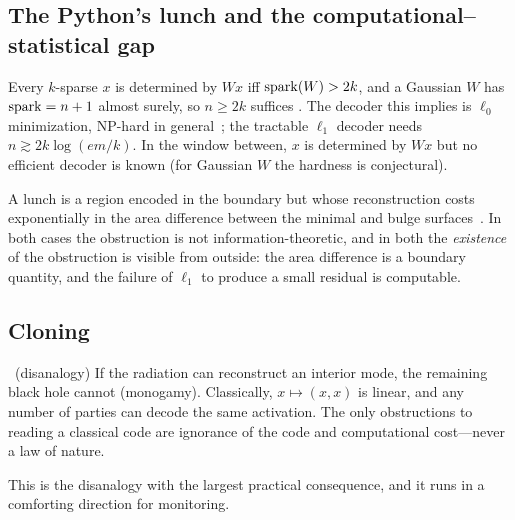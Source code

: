 \subsection{The Python's lunch and the computational--statistical gap}
Every $k$-sparse $x$ is determined by $Wx$ iff $\operatorname{spark}(W)>2k$, and a Gaussian $W$ has $\operatorname{spark}=n+1$ almost surely,
so $n\ge2k$ suffices \proved. The decoder this implies is $\ell_0$ minimization, NP-hard in
general~\cite{Natarajan}; the tractable $\ell_1$ decoder needs $n\gtrsim2k\log(em/k)$. In the window between, $x$
is determined by $Wx$ but no efficient decoder is known (for Gaussian $W$ the hardness is conjectural).
\begin{entry}\analogy
A lunch is a region encoded in the boundary but whose reconstruction costs exponentially in the area difference
between the minimal and bulge surfaces~\cite{Lunch}. In both cases the obstruction is not information-theoretic,
and in both the \emph{existence} of the obstruction is visible from outside: the area difference is a boundary
quantity, and the failure of $\ell_1$ to produce a small residual is computable.
\end{entry}

\subsection{Cloning}
\begin{entry}\proved\ (disanalogy)
If the radiation can reconstruct an interior mode, the remaining black hole cannot (monogamy). Classically,
$x\mapsto(x,x)$ is linear, and any number of parties can decode the same activation. The only obstructions to
reading a classical code are ignorance of the code and computational cost---never a law of nature.
\end{entry}
This is the disanalogy with the largest practical consequence, and it runs in a comforting direction for
monitoring.


